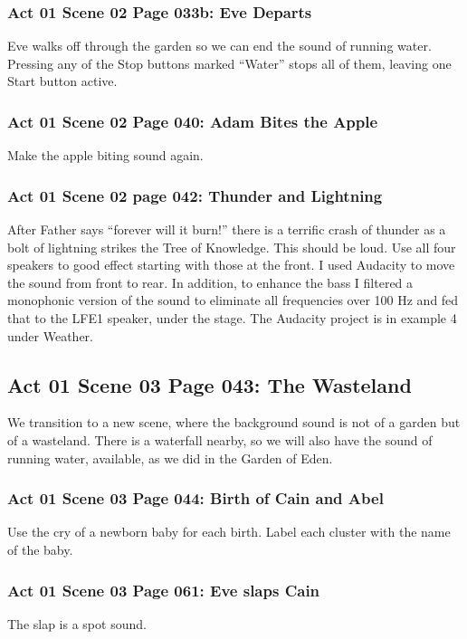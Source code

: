 \documentclass[letterpaper,twoside]{article}
\begin{document}
\subsubsection{Act 01 Scene 02 Page 033b: Eve Departs}
Eve walks off through the garden so
we can end the sound of running water.  Pressing any of the Stop
buttons marked ``Water'' stops all of them, leaving one Start button
active.

\subsubsection{Act 01 Scene 02 Page 040: Adam Bites the Apple}
Make the apple biting sound again.

\subsubsection{Act 01 Scene 02 page 042: Thunder and Lightning}
After Father says ``forever will it burn!'' there is a terrific
crash of thunder as a bolt of lightning strikes the Tree of Knowledge.
This should be loud.  Use all four speakers to good effect
starting with those at the front.  I used Audacity to move the sound
from front to rear.  In addition, to enhance the bass
I filtered a monophonic version of
the sound to eliminate all frequencies over 100 Hz and fed that
to the LFE1 speaker, under the stage.  The Audacity project is in
example 4 under Weather.

\subsection{Act 01 Scene 03 Page 043: The Wasteland}
We transition to a new scene, where the background sound
is not of a garden but of a wasteland.  There is a waterfall
nearby, so we will also have the sound of running water, available,
as we did in the Garden of Eden.

\subsubsection{Act 01 Scene 03 Page 044: Birth of Cain and Abel}
Use the cry of a newborn baby for each birth.  Label each cluster
with the name of the baby.

\subsubsection{Act 01 Scene 03 Page 061: Eve slaps Cain}
The slap is a spot sound.
\end{document}
